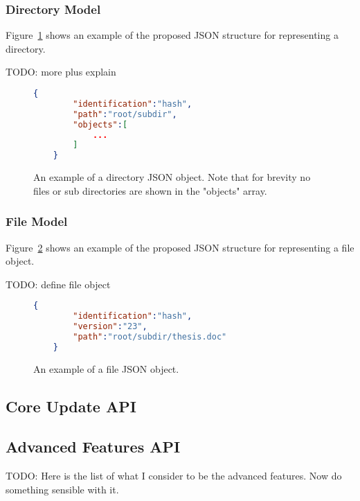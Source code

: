 \subsubsection{Directory Model}

Figure~\ref{json:directory_model} shows an example of the proposed JSON structure for representing a directory.

TODO: more plus explain

\begin{figure}[htp]
    \begin{lstlisting}[language=json,firstnumber=0]
    {
        "identification":"hash",
        "path":"root/subdir",
        "objects":[
            ...
        ]
    }
    \end{lstlisting}
\caption[Directory JSON Model]{An example of a directory JSON object. Note that for brevity no files or sub directories are shown in the "objects" array.}
\label{json:directory_model}
\end{figure}

\subsubsection{File Model}

Figure~\ref{json:file_model} shows an example of the proposed JSON structure for representing a file object.

TODO: define file object

\begin{figure}[htp]
    \begin{lstlisting}[language=json,firstnumber=0]
    {
        "identification":"hash",
        "version":"23",
        "path":"root/subdir/thesis.doc"
    }
    \end{lstlisting}
\caption[File JSON Model]{An example of a file JSON object.}
\label{json:file_model}
\end{figure}

\subsection{Core Update API}

\subsection{Advanced Features API}

TODO: Here is the list of what I consider to be the advanced features.
Now do something sensible with it.

